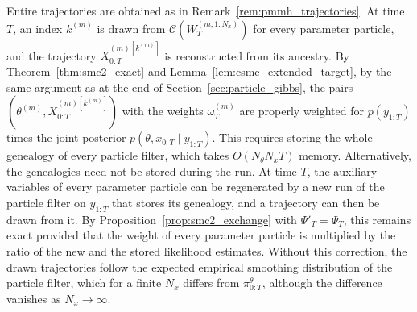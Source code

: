 Entire trajectories are obtained as in Remark~\ref{rem:pmmh_trajectories}. At time $T$, an index $k^{(m)}$ is drawn from $\mathcal{C}(W_T^{(m,1:N_x)})$ for every parameter particle, and the trajectory $X_{0:T}^{(m)[k^{(m)}]}$ is reconstructed from its ancestry. By Theorem~\ref{thm:smc2_exact} and Lemma~\ref{lem:csmc_extended_target}, by the same argument as at the end of Section~\ref{sec:particle_gibbs}, the pairs $(\theta^{(m)},X_{0:T}^{(m)[k^{(m)}]})$ with the weights $\omega_T^{(m)}$ are properly weighted for $p(y_{1:T})$ times the joint posterior $p(\theta,x_{0:T}\mid y_{1:T})$. This requires storing the whole genealogy of every particle filter, which takes $O(N_\theta N_xT)$ memory. Alternatively, the genealogies need not be stored during the run. At time $T$, the auxiliary variables of every parameter particle can be regenerated by a new run of the particle filter on $y_{1:T}$ that stores its genealogy, and a trajectory can then be drawn from it. By Proposition~\ref{prop:smc2_exchange} with $\Psi'_T = \Psi_T$, this remains exact provided that the weight of every parameter particle is multiplied by the ratio of the new and the stored likelihood estimates. Without this correction, the drawn trajectories follow the expected empirical smoothing distribution of the particle filter, which for a finite $N_x$ differs from $\pi_{0:T}^\theta$, although the difference vanishes as $N_x\to\infty$.

